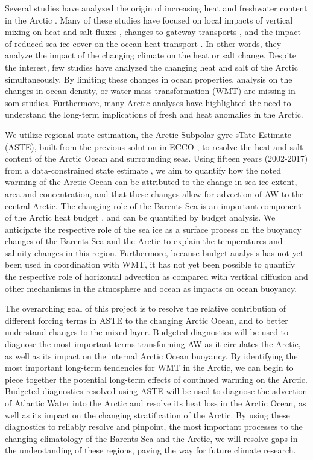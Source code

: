 \documentclass[a4paper,12pt]{article}
\begin{document}
        Several studies have analyzed the origin of increasing heat and freshwater content in the Arctic \cite{Haine2015,Polyakov2017}. Many of these studies have focused on local impacts of vertical mixing on heat and salt fluxes \cite{Polyakov2020,Lundesgaard2022,Schulz2022}, changes to gateway transports \cite{Oldenburg2024}, and the impact of reduced sea ice cover on the ocean heat transport \cite{Timmermans2018}. In other words, they analyze the impact of the changing climate on the heat or salt change. Despite the interest, few studies have analyzed the changing heat and salt of the Arctic simultaneously. By limiting these changes in ocean properties, analysis on the changes in ocean density, or water mass transformation (WMT) are missing in som studies. Furthermore, many Arctic analyses have highlighted the need to understand the long-term implications of fresh and heat anomalies in the Arctic.

        We utilize regional state estimation, the Arctic Subpolar gyre sTate Estimate (ASTE), built from the previous solution in ECCO \cite{Forget2015}, to resolve the heat and salt content of the Arctic Ocean and surrounding seas. Using fifteen years (2002-2017) from a data-constrained state estimate \cite{Nguyen2021}, we aim to quantify how the noted warming of the Arctic Ocean can be attributed to the change in sea ice extent, area and concentration, and that these changes allow for advection of AW to the central Arctic. The changing role of the Barents Sea is an important component of the Arctic heat budget \cite{Arthun2016}, and can be quantified by budget analysis. We anticipate the respective role of the sea ice as a surface process on the buoyancy changes of the Barents Sea and the Arctic to explain the temperatures and salinity changes in this region. Furthermore, because budget analysis has not yet been used in coordination with WMT, it has not yet been possible to quantify the respective role of horizontal advection as compared with vertical diffusion and other mechanisms in the atmosphere and ocean as impacts on ocean buoyancy.

        The overarching goal of this project is to resolve the relative contribution of different forcing terms in ASTE to the changing Arctic Ocean, and to better understand changes to the mixed layer. Budgeted diagnostics will be used to diagnose the most important terms transforming AW as it circulates the Arctic, as well as its impact on the internal Arctic Ocean buoyancy. By identifying the most important long-term tendencies for WMT in the Arctic, we can begin to piece together the potential long-term effects of continued warming on the Arctic. Budgeted diagnostics resolved using ASTE will be used to diagnose the advection of Atlantic Water into the Arctic and resolve its heat loss in the Arctic Ocean, as well as its impact on the changing stratification of the Arctic. By using these diagnostics to reliably resolve and pinpoint, the most important processes to the changing climatology of the Barents Sea and the Arctic, we will resolve gaps in the understanding of these regions, paving the way for future climate research.
    
\end{document}
